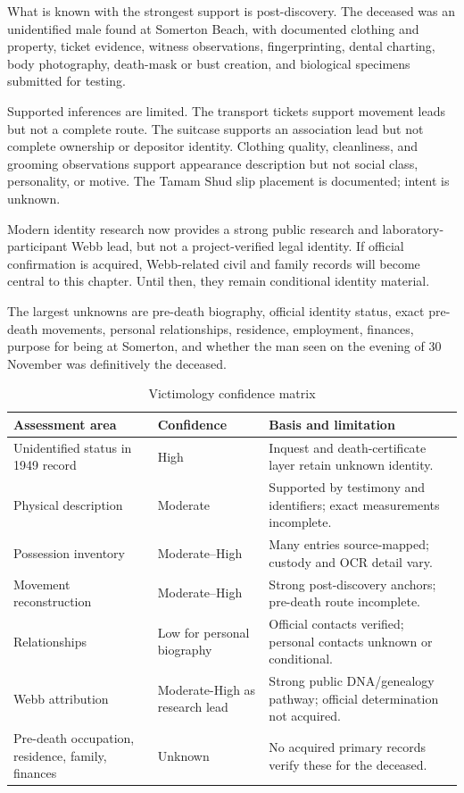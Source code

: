 What is known with the strongest support is post-discovery. The deceased was an unidentified male found at Somerton Beach, with documented clothing and property, ticket evidence, witness observations, fingerprinting, dental charting, body photography, death-mask or bust creation, and biological specimens submitted for testing.

Supported inferences are limited. The transport tickets support movement leads but not a complete route. The suitcase supports an association lead but not complete ownership or depositor identity. Clothing quality, cleanliness, and grooming observations support appearance description but not social class, personality, or motive. The Tamam Shud slip placement is documented; intent is unknown.

Modern identity research now provides a strong public research and laboratory-participant Webb lead, but not a project-verified legal identity. If official confirmation is acquired, Webb-related civil and family records will become central to this chapter. Until then, they remain conditional identity material.

The largest unknowns are pre-death biography, official identity status, exact pre-death movements, personal relationships, residence, employment, finances, purpose for being at Somerton, and whether the man seen on the evening of 30 November was definitively the deceased.

\begin{table}[htbp]
\centering
\caption{Victimology confidence matrix}
\label{tab:victimology-confidence-matrix}
\begin{tabularx}{\textwidth}{>{\raggedright\arraybackslash}p{}>{\raggedright\arraybackslash}p{}>{\raggedright\arraybackslash}X}
\toprule
Assessment area & Confidence & Basis and limitation \\
\midrule
Unidentified status in 1949 record & High & Inquest and death-certificate layer retain unknown identity. \\
Physical description & Moderate & Supported by testimony and identifiers; exact measurements incomplete. \\
Possession inventory & Moderate--High & Many entries source-mapped; custody and OCR detail vary. \\
Movement reconstruction & Moderate--High & Strong post-discovery anchors; pre-death route incomplete. \\
Relationships & Low for personal biography & Official contacts verified; personal contacts unknown or conditional. \\
Webb attribution & Moderate-High as research lead & Strong public DNA/genealogy pathway; official determination not acquired. \\
Pre-death occupation, residence, family, finances & Unknown & No acquired primary records verify these for the deceased. \\
\bottomrule
\end{tabularx}
\end{table}
